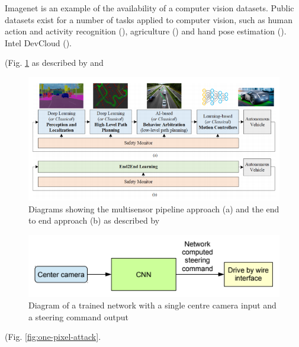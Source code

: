 Imagenet is an example of the availability of a computer vision datasets. Public datasets exist for a number of tasks applied to computer vision, such as  
human action and activity recognition (\cite{chaquet2013survey}), agriculture (\cite{lu2020survey}) and hand pose estimation (\cite{li2019survey}).
Intel DevCloud (\cite{IntelDevCloud2020}).


% 
(Fig. \ref{fig:grigorescu-pipeline} as described by \cite{Grigorescu_2020} and \cite{Yurtsever_2020}

\begin{figure}[ht]
 \centering 
 \includegraphics[scale=0.85]{Figures/grigorescu-pipeline.png}
 \caption{Diagrams showing the multisensor pipeline approach (a) and the end to end approach (b) as described by \cite{Grigorescu_2020}}
 \label{fig:grigorescu-pipeline}
\end{figure}


\begin{figure}[ht]
 \centering 
 \includegraphics[scale=1]{Figures/bojarski-nvidia.png}
 \caption{Diagram of a trained network with a single centre camera input and a steering command output}
 \label{fig:bojarski-net}
\end{figure}


 (Fig. \ref{fig:one-pixel-attack}.
 
